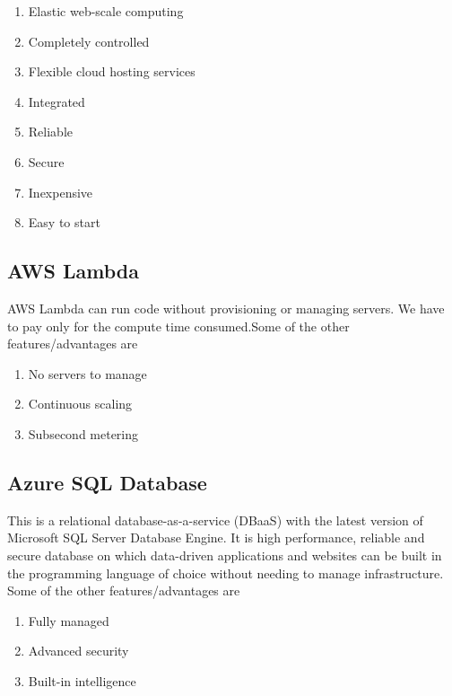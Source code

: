 \documentclass[journal]{hybrid-cloud}
\begin{document}
\begin{enumerate}
	\item Elastic web-scale computing
	\item Completely controlled
	\item Flexible cloud hosting services
	\item Integrated
	\item Reliable
	\item Secure
	\item Inexpensive
	\item Easy to start
\end{enumerate}

\subsection{AWS Lambda} 
AWS Lambda can run code without provisioning or managing servers. We have to pay only for the compute time consumed.Some of the other features/advantages are \cite{LambdaDoc}

\begin{enumerate}
	\item No servers to manage
	\item Continuous scaling
	\item Subsecond metering
\end{enumerate}

\subsection{Azure SQL Database}
This is a relational database-as-a-service (DBaaS) with the latest version of Microsoft SQL Server Database Engine. It is high performance, reliable and secure database on which data-driven applications and websites can be built in the programming language of choice without needing to manage infrastructure. Some of the other features/advantages are  \cite{AzureSQLDB}

\begin{enumerate}
	\item Fully managed
	\item Advanced security
	\item Built-in intelligence
\end{enumerate}

\end{document}
